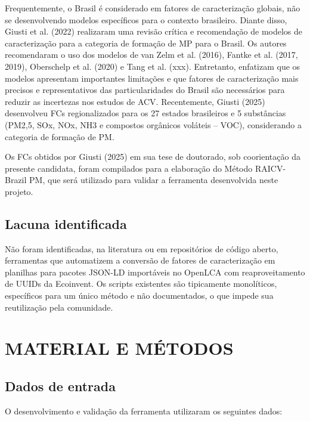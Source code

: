 Frequentemente, o Brasil é considerado em fatores de caracterização globais, não se desenvolvendo modelos específicos para o contexto brasileiro. Diante disso, Giusti et al. (2022) realizaram uma revisão crítica e recomendação de modelos de caracterização para a categoria de formação de MP para o Brasil. Os autores recomendaram o uso dos modelos de van Zelm et al. (2016), Fantke et al. (2017, 2019), Oberschelp et al. (2020) e Tang et al. (xxx). Entretanto, enfatizam que os modelos apresentam importantes limitações e que fatores de caracterização mais precisos e representativos das particularidades do Brasil são necessários para reduzir as incertezas nos estudos de ACV. Recentemente, Giusti (2025) desenvolveu FCs regionalizados para os 27 estados brasileiros e 5 substâncias (PM2,5, SOx, NOx, NH3 e compostos orgânicos voláteis – VOC), considerando a categoria de formação de PM.

Os FCs obtidos por Giusti (2025) em sua tese de doutorado, sob coorientação da presente candidata, foram compilados para a elaboração do Método RAICV-Brazil PM, que será utilizado para validar a ferramenta desenvolvida neste projeto.



\subsection{Lacuna identificada}

N\~ao foram identificadas, na literatura ou em reposit\'orios de c\'odigo aberto, ferramentas que automatizem a convers\~ao de fatores de caracteriza\c{c}\~ao em planilhas para pacotes JSON-LD import\'aveis no OpenLCA com reaproveitamento de UUIDs da Ecoinvent. Os scripts existentes s\~ao tipicamente monol\'iticos, espec\'ificos para um \'unico m\'etodo e n\~ao documentados, o que impede sua reutiliza\c{c}\~ao pela comunidade.

\section{MATERIAL E M\'ETODOS}

\subsection{Dados de entrada}

O desenvolvimento e valida\c{c}\~ao da ferramenta utilizaram os seguintes dados:

